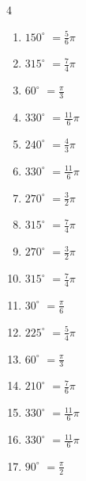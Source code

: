 \begin{multicols}{4}
\begin{enumerate}
  \item $\displaystyle 150^{\circ}$
        $\displaystyle =\frac{5}{6}\pi$

  \item $\displaystyle 315^{\circ}$
        $\displaystyle =\frac{7}{4}\pi$

  \item $\displaystyle 60^{\circ}$
        $\displaystyle =\frac{\pi}{3}$

  \item $\displaystyle 330^{\circ}$
        $\displaystyle =\frac{11}{6}\pi$

  \item $\displaystyle 240^{\circ}$
        $\displaystyle =\frac{4}{3}\pi$

  \item $\displaystyle 330^{\circ}$
        $\displaystyle =\frac{11}{6}\pi$

  \item $\displaystyle 270^{\circ}$
        $\displaystyle =\frac{3}{2}\pi$

  \item $\displaystyle 315^{\circ}$
        $\displaystyle =\frac{7}{4}\pi$

  \item $\displaystyle 270^{\circ}$
        $\displaystyle =\frac{3}{2}\pi$

  \item $\displaystyle 315^{\circ}$
        $\displaystyle =\frac{7}{4}\pi$

  \item $\displaystyle 30^{\circ}$
        $\displaystyle =\frac{\pi}{6}$

  \item $\displaystyle 225^{\circ}$
        $\displaystyle =\frac{5}{4}\pi$

  \item $\displaystyle 60^{\circ}$
        $\displaystyle =\frac{\pi}{3}$

  \item $\displaystyle 210^{\circ}$
        $\displaystyle =\frac{7}{6}\pi$

  \item $\displaystyle 330^{\circ}$
        $\displaystyle =\frac{11}{6}\pi$

  \item $\displaystyle 330^{\circ}$
        $\displaystyle =\frac{11}{6}\pi$

  \item $\displaystyle 90^{\circ}$
        $\displaystyle =\frac{\pi}{2}$


\end{enumerate}
\end{multicols}
